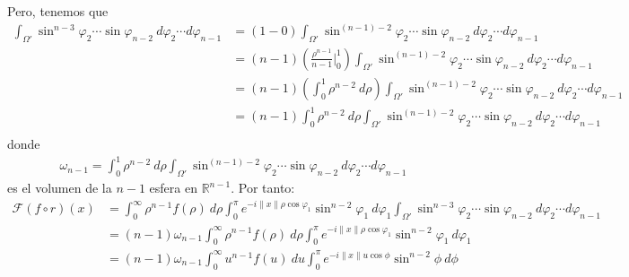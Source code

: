 \documentclass[12pt]{report}
\theoremstyle{largebreak}
\newcommand\norm[1]{\ensuremath{\|#1\|}}
\newcommand{\fou}[1]{\ensuremath{\mathcal{F}#1}}
\begin{document}
\begin{sol}
\begin{equation*}
        \end{equation*}
        Pero, tenemos que
        \begin{equation*}
            \begin{split}
                \int_{\Omega'} \sin^{ n-3}\varphi_2\cdots\sin\varphi_{ n-2} \: d\varphi_{2}\cdots d\varphi_{ n-1}&=(1-0)\int_{\Omega'}\sin^{(n-1)-2}\varphi_2\cdots\sin\varphi_{ n-2} \: d\varphi_{2}\cdots d\varphi_{ n-1}\\
                &=(n-1)\left(\frac{\rho^{n-1}}{n-1}\Big|_{0}^1\right)\int_{\Omega'}\sin^{(n-1)-2}\varphi_2\cdots\sin\varphi_{ n-2} \: d\varphi_{2}\cdots d\varphi_{ n-1}\\
                &=(n-1)\left(\int_0^1\rho^{ n-2}\:d\rho\right)\int_{\Omega'}\sin^{(n-1)-2}\varphi_2\cdots\sin\varphi_{ n-2} \: d\varphi_{2}\cdots d\varphi_{ n-1}\\
                &=(n-1)\int_0^1\rho^{ n-2}\:d\rho\int_{\Omega'}\sin^{(n-1)-2}\varphi_2\cdots\sin\varphi_{ n-2} \: d\varphi_{2}\cdots d\varphi_{ n-1}\\
            \end{split}
        \end{equation*}
        donde
        \begin{equation*}
            \begin{split}
                \omega_{ n-1}=\int_0^1\rho^{ n-2}\:d\rho\int_{\Omega'}\sin^{(n-1)-2}\varphi_2\cdots\sin\varphi_{ n-2} \: d\varphi_{2}\cdots d\varphi_{ n-1}
            \end{split}
        \end{equation*}
        es el volumen de la $n-1$ esfera en $\mathbb{R}^{ n-1}$. Por tanto:
        \begin{equation*}
            \begin{split}
                \fou{(f\circ r)}(x)&=\int_{0}^\infty \rho^{ n-1}f(\rho)\:d\rho \int_{0}^\pi e^{ -i\norm{x}\rho\cos\varphi_1}\sin^{ n-2}\varphi_1\:d\varphi_1 \int_{\Omega'} \sin^{ n-3}\varphi_2\cdots\sin\varphi_{ n-2} \: d\varphi_{2}\cdots d\varphi_{ n-1}\\
                &=(n-1)\omega_{n-1}\int_{0}^\infty \rho^{ n-1}f(\rho)\:d\rho \int_{0}^\pi e^{ -i\norm{x}\rho\cos\varphi_1}\sin^{ n-2}\varphi_1\:d\varphi_1\\
                &=(n-1)\omega_{n-1}\int_{0}^\infty u^{ n-1}f(u)\:du \int_{0}^\pi e^{ -i\norm{x}u\cos\phi}\sin^{ n-2}\phi\:d\phi\\
            \end{split}
        \end{equation*}

\end{sol}
\end{document}
